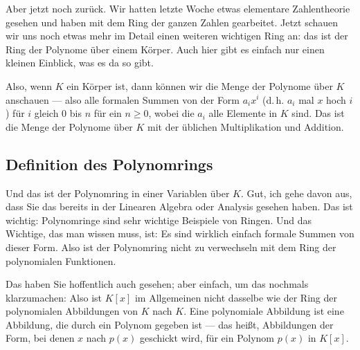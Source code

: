 \begin{spoken-clean}[00:00:38 - 00:02:27]
Aber jetzt noch zurück. Wir hatten letzte Woche etwas elementare Zahlentheorie gesehen und haben mit dem Ring der ganzen Zahlen gearbeitet. Jetzt schauen wir uns noch etwas mehr im Detail einen weiteren wichtigen Ring an: das ist der Ring der Polynome über einem Körper. Auch hier gibt es einfach nur einen kleinen Einblick, was es da so gibt. 

Also, wenn $K$ ein Körper ist, dann können wir die Menge der Polynome über $K$ anschauen --- also alle formalen Summen von der Form $a_i x^i$ (d.\,h. $a_i$ mal $x$ hoch $i$) für $i$ gleich $0$ bis $n$ für ein $n \ge 0$, wobei die $a_i$ alle Elemente in $K$ sind. Das ist die Menge der Polynome über $K$ mit der üblichen Multiplikation und Addition.
\end{spoken-clean}

\subsection{Definition des Polynomrings}

\begin{math-stroke}
\end{math-stroke}

\begin{spoken-clean}[00:02:27 - 00:06:20]
Und das ist der Polynomring in einer Variablen über $K$. Gut, ich gehe davon aus, dass Sie das bereits in der Linearen Algebra oder Analysis gesehen haben. Das ist wichtig: Polynomringe sind sehr wichtige Beispiele von Ringen. Und das Wichtige, das man wissen muss, ist: Es sind wirklich einfach formale Summen von dieser Form. Also ist der Polynomring nicht zu verwechseln mit dem Ring der polynomialen Funktionen.

Das haben Sie hoffentlich auch gesehen; aber einfach, um das nochmals klarzumachen: Also ist $K[x]$ im Allgemeinen nicht dasselbe wie der Ring der polynomialen Abbildungen von $K$ nach $K$. Eine polynomiale Abbildung ist eine Abbildung, die durch ein Polynom gegeben ist --- das heißt, Abbildungen der Form, bei denen $x$ nach $p(x)$ geschickt wird, für ein Polynom $p(x)$ in $K[x]$.
\end{spoken-clean}

